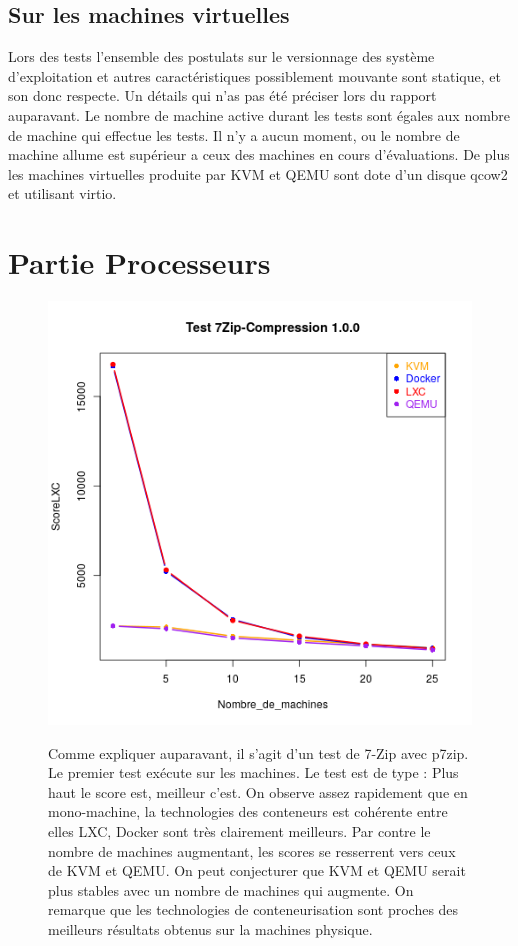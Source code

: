 \subsection{Sur les machines virtuelles}
Lors des tests l'ensemble des postulats sur le versionnage des système d'exploitation et autres caractéristiques possiblement mouvante sont statique, et son donc respecte.
Un détails qui n'as pas été préciser lors du rapport auparavant. Le nombre de machine active durant les tests sont égales aux nombre de machine qui effectue les tests. Il n'y a aucun moment, ou le nombre de machine allume est supérieur a ceux des machines en cours d’évaluations.
De plus les machines virtuelles produite par KVM et QEMU sont dote d'un disque qcow2 et utilisant virtio.
\newpage
\section{Partie Processeurs}
\begin{figure}[h]
   \begin{minipage}[c]{.46\linewidth}
	   \includegraphics[scale=0.55]{resultats/7zip.png}
   \end{minipage} \hfill
   \begin{minipage}[c]{.46\linewidth}
   	 Comme expliquer auparavant, il s'agit d'un test de 7-Zip avec p7zip. Le premier test exécute sur les machines. Le test est de type : Plus haut le score est, meilleur c'est.  On observe assez rapidement que en mono-machine, la technologies des conteneurs est cohérente entre elles LXC, Docker sont très clairement meilleurs. Par contre le nombre de machines augmentant,  les scores se resserrent vers ceux de KVM et QEMU. On peut conjecturer que KVM et QEMU serait plus stables avec un nombre de machines qui augmente. On remarque que les technologies de conteneurisation sont proches des meilleurs résultats obtenus sur la machines physique. 
   	 \end{minipage}
\end{figure}
